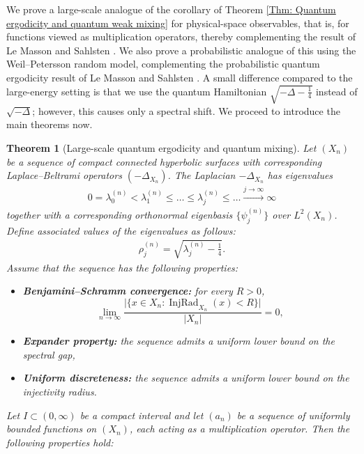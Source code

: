 \documentclass[11pt,twoside,reqno]{amsart} \usepackage{a4wide} \usepackage[T1]{fontenc} \usepackage[utf8]{inputenc} \usepackage{soul}  \usepackage{amsmath} \usepackage{amsfonts} \usepackage{amssymb} \usepackage{mathtools} \usepackage{amsthm} \usepackage{xcolor} \usepackage{graphicx} \usepackage{hyperref} \usepackage{standalone} \usepackage{esint} \usepackage{comment} \usepackage[left=2.3cm,top=3cm,right=2.3cm]{geometry} \usepackage{bm} \usepackage{svg} \usepackage{float} \numberwithin{equation}{section} \theoremstyle{plain} \newtheorem{thm}{Theorem}[section] \newtheorem{theorem}[thm]{Theorem} \newtheorem*{theorem*}{Theorem}\newtheorem{conj}[thm]{Conjecture} \newtheorem{lemma}[thm]{Lemma} \newtheorem{prop}[thm]{Proposition} \newtheorem{proposition}[thm]{Proposition} \newtheorem{cor}[thm]{Corollary} \newtheorem{question}[thm]{Question} \newtheorem{corollary}[thm]{Corollary} \newtheorem{assumption}[thm]{Assumption} \theoremstyle{definition} \newtheorem{defn}[thm]{Definition} \newtheorem{choice}[thm]{Choice} \newtheorem{definition}[thm]{Definition} \newtheorem{ex}[thm]{Example} \newtheorem{notation}[thm]{Notation} \newtheorem*{ack}{Acknowledgements} \theoremstyle{remark} \newtheorem{remark}[thm]{Remark} \newtheorem{bigremark}[thm]{Remark} \usepackage{xcolor} \newcommand{\red}[1]{ {\color{Red}#1} } \newcommand{\blue}[1]{ {\color{Blue}#1} } \author{Kai Hippi} \address{Aalto University, Espoo, Finland} \email{kai.hippi@aalto.fi}
\begin{document}
We prove a large-scale analogue of the corollary of Theorem \ref{Thm: Quantum ergodicity and quantum weak mixing} for physical-space observables, that is, for functions viewed as multiplication operators, thereby complementing the result of Le Masson and Sahlsten \cite{LS17}. We also prove a probabilistic analogue of this using the Weil--Petersson random model, complementing the probabilistic quantum ergodicity result of Le Masson and Sahlsten \cite{LS24}. A small difference compared to the large-energy setting is that we use the quantum Hamiltonian $ \sqrt{-\Delta - \tfrac14} $ instead of $ \sqrt{-\Delta} $; however, this causes only a spectral shift. We proceed to introduce the main theorems now.

\begin{theorem}[Large-scale quantum ergodicity and quantum mixing]
\label{Thm: Large-scale analogue}
Let $ (X_{n}) $ be a sequence of compact connected hyperbolic surfaces with corresponding Laplace--Beltrami operators \( (-\Delta_{X_{n}}) \). The Laplacian $ -\Delta_{X_{n}} $ has eigenvalues
	\begin{align*}
		0 = \lambda_{0}^{( n )} < \lambda_{1}^{( n )} \leq \dots \leq \lambda_{j}^{( n )} \leq \dots \xrightarrow{j \to \infty} \infty
	\end{align*}
together with a corresponding orthonormal eigenbasis $ \{ \psi_{j}^{( n )} \} $ over $ L^{2}( X_n ) $. Define associated values of the eigenvalues as follows:
\begin{align*}
	\rho_{j}^{( n )} = \sqrt{ \lambda_{j}^{( n )} - \tfrac{1}{4} }.
\end{align*}
Assume that the sequence has the following properties:
\begin{itemize}
    \item[\textbf{(BSC)}] \textbf{Benjamini--Schramm convergence:}
    for every \( R > 0 \),
    $$
        \lim_{n \to \infty} 
        \frac{
            \big| \{ x \in X_{n} : \operatorname{InjRad}_{X_{n}}(x) < R \} \big|
        }{
            |X_{n}|
        } = 0,
    $$
    \item[\textbf{(EXP)}] \textbf{Expander property:}
    the sequence admits a uniform lower bound on the spectral gap,
    \item[\textbf{(UND)}] \textbf{Uniform discreteness:}
    the sequence admits a uniform lower bound on the injectivity radius.
\end{itemize}
Let $ I \subset ( 0,\infty ) $ be a compact interval and let $ ( a_{n} ) $ be a sequence of uniformly bounded functions on $ ( X_{n} ) $, each acting as a multiplication operator. Then the following properties hold:

\end{theorem}
\end{document}
